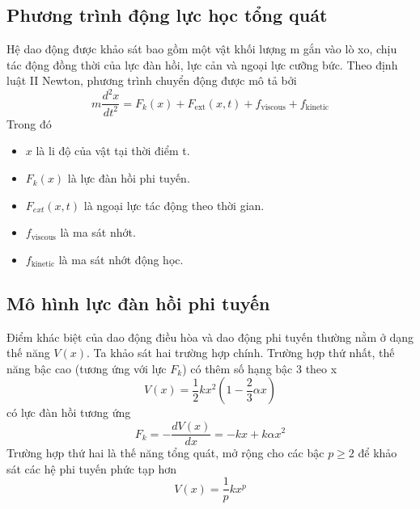 \subsection{Phương trình động lực học tổng quát}
Hệ dao động được khảo sát bao gồm một vật khối lượng m gắn vào lò xo, chịu tác động đồng thời của lực đàn hồi, lực cản và ngoại lực cưỡng bức. Theo định luật II Newton, phương trình chuyển động được mô tả bởi
\begin{equation}
    m\frac{d^2x}{dt^2}= F_k(x) + F_{\text{ext}}(x,t) + f_{\text{viscous}} + f_{\text{kinetic}}
\end{equation}
Trong đó
\begin{itemize}
    \item $x$ là li độ của vật tại thời điểm t.
    \item $F_k(x)$ là lực đàn hồi phi tuyến.
    \item $F_{ext}(x,t)$ là ngoại lực tác động theo thời gian.
    \item $f_{\text{viscous}}$ là ma sát nhớt.
    \item $f_{\text{kinetic}}$ là ma sát nhớt động học.
\end{itemize}

\subsection{Mô hình lực đàn hồi phi tuyến}
Điểm khác biệt của dao động điều hòa và dao động phi tuyến thường nằm ở dạng thế năng $V(x)$. Ta khảo sát hai trường hợp chính.
Trường hợp thứ nhất, thế năng bậc cao (tương ứng với lực $F_k$) có thêm số hạng bậc 3 theo x
    \begin{equation}
        V(x)=\frac{1}{2}kx^2(1-\frac{2}{3}\alpha x)
    \end{equation}
có lực đàn hồi tương ứng
\begin{equation}
    F_k=-\frac{dV(x)}{dx}=-kx+k\alpha x^2 
\end{equation}
Trường hợp thứ hai là thế năng tổng quát, mở rộng cho các bậc $p \ge 2$ để khảo sát các hệ phi tuyến phức tạp hơn
\begin{equation}
    V(x)=\frac{1}{p}kx^p
\end{equation}

